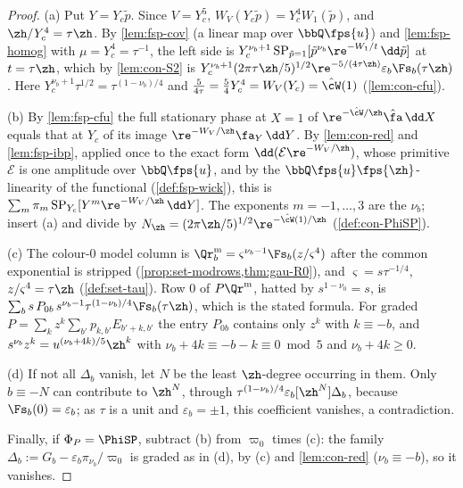 \begin{proof}
(a) Put $Y=Y_c\tilde p$. Since $V=Y_c^5$, $W_V(Y_c\tilde p)=Y_c^4W_1(\tilde p)$, and $\zh/Y_c^4=\tau\zh$. By \cref{lem:fsp-cov} (a linear map over $\bbQ\fps{u}$) and \cref{lem:fsp-homog} with $\mu=Y_c^4=\tau^{-1}$, the left side is $Y_c^{\nu_b+1}\,\mathrm{SP}_{\tilde p=1}[\tilde p^{\nu_b}\re^{-W_1/t}\,\dd\tilde p]$ at $t=\tau\zh$, which by \cref{lem:con-S2} is $Y_c^{\nu_b+1}(2\pi\tau\zh/5)^{1/2}\re^{-5/(4\tau\zh)}\varepsilon_b\Fs_b(\tau\zh)$. Here $Y_c^{\nu_b+1}\tau^{1/2}=\tau^{(1-\nu_b)/4}$ and $\frac5{4\tau}=\frac54Y_c^4=W_V(Y_c)=\hat\cW(1)$ (\cref{lem:con-cfu}).

(b) By \cref{lem:fsp-cfu} the full stationary phase at $X=1$ of $\re^{-\hat\cW/\zh}\hat\fa\,\dd X$ equals that at $Y_c$ of its image $\re^{-W_V/\zh}\fa_Y\,\dd Y$. By \cref{lem:con-red} and \cref{lem:fsp-ibp}, applied once to the exact form $\dd(\mathcal E\re^{-W_V/\zh})$, whose primitive $\mathcal E$ is one amplitude over $\bbQ\fps{u}$, and by the $\bbQ\fps{u}\fps{\zh}$-linearity of the functional (\cref{def:fsp-wick}), this is $\sum_m\pi_m\,\mathrm{SP}_{Y_c}[Y^m\re^{-W_V/\zh}\,\dd Y]$. The exponents $m=-1,\dots,3$ are the $\nu_b$; insert (a) and divide by $N_{\zh}=(2\pi\zh/5)^{1/2}\re^{-\hat\cW(1)/\zh}$ (\cref{def:con-PhiSP}).

(c) The colour-$0$ model column is $\Qr^{\mathrm m}_b=\varsigma^{\nu_b-1}\Fs_b(z/\varsigma^4)$ after the common exponential is stripped (\cref{prop:set-modrows,thm:gau-R0}), and $\varsigma=s\tau^{-1/4}$, $z/\varsigma^4=\tau\zh$ (\cref{def:set-tau}). Row $0$ of $P\Qr^{\mathrm m}$, hatted by $s^{1-\nu_0}=s$, is $\sum_bs\,P_{0b}\,s^{\nu_b-1}\tau^{(1-\nu_b)/4}\Fs_b(\tau\zh)$, which is the stated formula. For graded $P=\sum_kz^k\sum_{b'}p_{k,b'}E_{b'+k,b'}$ the entry $P_{0b}$ contains only $z^k$ with $k\equiv-b$, and $s^{\nu_b}z^k=u^{(\nu_b+4k)/5}\zh^k$ with $\nu_b+4k\equiv-b-k\equiv0\bmod5$ and $\nu_b+4k\geq0$.

(d) If not all $\Delta_b$ vanish, let $N$ be the least $\zh$-degree occurring in them. Only $b\equiv-N$ can contribute to $\zh^N$, through $\tau^{(1-\nu_b)/4}\varepsilon_b[\zh^N]\Delta_b$, because $\Fs_b(0)=\varepsilon_b$; as $\tau$ is a unit and $\varepsilon_b=\pm1$, this coefficient vanishes, a contradiction.

Finally, if $\Phi_P=\PhiSP$, subtract (b) from $\varpi_0$ times (c): the family $\Delta_b:=G_b-\varepsilon_b\pi_{\nu_b}/\varpi_0$ is graded as in (d), by (c) and \cref{lem:con-red} ($\nu_b\equiv-b$), so it vanishes.
\end{proof}

